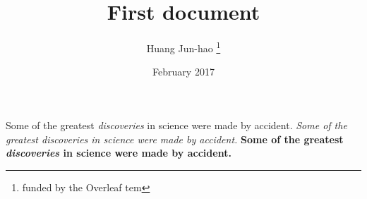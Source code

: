 \documentclass[12pt,letterpaper,twoside]{article}
\title{First document}
\author{Huang Jun-hao \thanks {funded by the Overleaf tem}}
\date{February 2017}
\begin{document}
\maketitle
Some of the greatest \emph{discoveries} in science were made by accident.
\textit{Some of the greatest \emph{discoveries} in science were made by accident.}
\textbf{Some of the greatest \emph{discoveries} in science were made by accident.}
\end{document}
